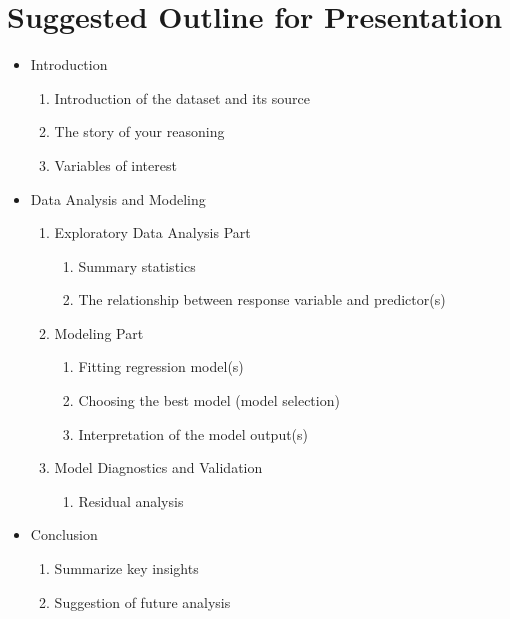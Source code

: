 \documentclass[12pt]{article}
\begin{document}
\section*{Suggested Outline for Presentation}
\begin{itemize}
    \item Introduction
    \begin{enumerate}
        \item Introduction of the dataset and its source
        \item The story of your reasoning
        \item Variables of interest 
    \end{enumerate}
    \item Data Analysis and Modeling
    \begin{enumerate}
        \item Exploratory Data Analysis Part
        \begin{enumerate}
            \item Summary statistics 
            \item The relationship between response variable and predictor(s)  
        \end{enumerate}
        \item Modeling Part
        \begin{enumerate}
            \item Fitting regression model(s)
            \item Choosing the best model (model selection)
            \item Interpretation of the model output(s)
        \end{enumerate} 
        \item Model Diagnostics and Validation
        \begin{enumerate}
            \item Residual analysis
        \end{enumerate}

    \end{enumerate}
    
    \item Conclusion
        \begin{enumerate}
            \item Summarize key insights
            \item Suggestion of future analysis 
        \end{enumerate} 
\end{itemize}
\end{document}
